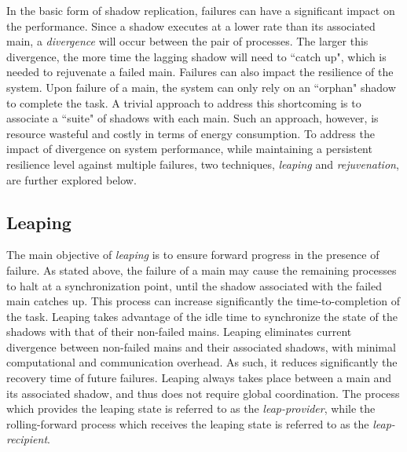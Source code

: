 
In the basic form of shadow replication, failures can have a significant impact on the performance. Since a shadow executes at a lower rate than its associated main, a {\it divergence} will occur between the pair of processes. The larger this divergence, the more time the lagging shadow will need to ``catch up", which is needed to rejuvenate a failed main. 
Failures can also impact the resilience of the system. Upon failure of a main, the system can only rely on  an ``orphan" shadow to complete the task. A trivial approach to address this shortcoming is to associate a ``suite" of shadows with each main. Such an approach, however, is resource wasteful and costly in terms of energy consumption. To address the impact of divergence on system performance, while maintaining a persistent resilience level against multiple failures, two techniques, \textit{leaping} and \textit{rejuvenation}, are further explored below.

\subsection{Leaping}

The main objective of \textit{leaping} is to ensure forward progress in the presence of failure. As stated above, the failure of a main may cause the remaining processes to halt at a synchronization point, until the shadow associated with the failed main catches up. This process can increase significantly the time-to-completion of the task. Leaping takes  advantage of the idle time to synchronize the state of the shadows with that of their non-failed mains. 
Leaping eliminates current divergence between non-failed mains and their associated shadows, with minimal computational and communication overhead. As such, it reduces significantly the recovery time of future failures. 
Leaping always takes place between a main and its associated shadow, and thus does not require global coordination. The process which provides the leaping state is referred to as the 
\textit{leap-provider},  while the rolling-forward process which receives the leaping state is referred to as the \textit{leap-recipient}. 

